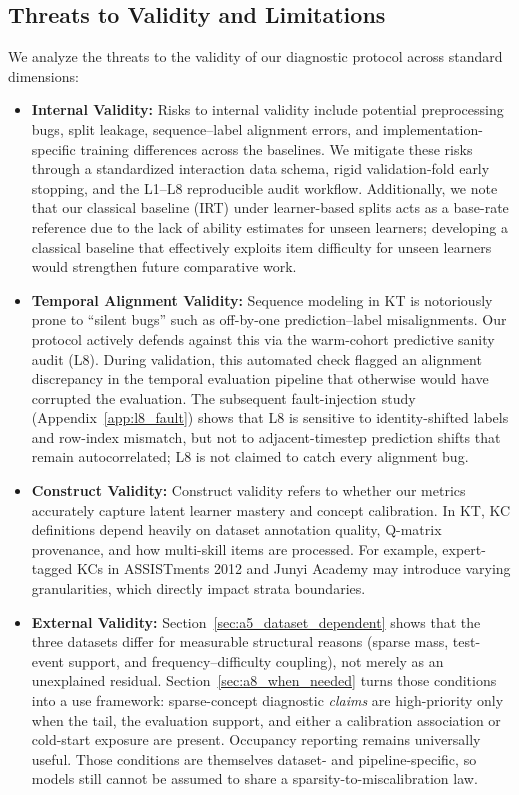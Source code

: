 \subsection{Threats to Validity and Limitations}
\label{sec:threats}
We analyze the threats to the validity of our diagnostic protocol across standard dimensions:
\begin{itemize}
    \item \textbf{Internal Validity:} Risks to internal validity include potential preprocessing bugs, split leakage, sequence--label alignment errors, and implementation-specific training differences across the baselines. We mitigate these risks through a standardized interaction data schema, rigid validation-fold early stopping, and the L1--L8 reproducible audit workflow. Additionally, we note that our classical baseline (IRT) under learner-based splits acts as a base-rate reference due to the lack of ability estimates for unseen learners; developing a classical baseline that effectively exploits item difficulty for unseen learners would strengthen future comparative work.
    \item \textbf{Temporal Alignment Validity:} Sequence modeling in KT is notoriously prone to ``silent bugs'' such as off-by-one prediction--label misalignments. Our protocol actively defends against this via the warm-cohort predictive sanity audit (L8). During validation, this automated check flagged an alignment discrepancy in the temporal evaluation pipeline that otherwise would have corrupted the evaluation. The subsequent fault-injection study (Appendix~\ref{app:l8_fault}) shows that L8 is sensitive to identity-shifted labels and row-index mismatch, but not to adjacent-timestep prediction shifts that remain autocorrelated; L8 is not claimed to catch every alignment bug.
    \item \textbf{Construct Validity:} Construct validity refers to whether our metrics accurately capture latent learner mastery and concept calibration. In KT, KC definitions depend heavily on dataset annotation quality, Q-matrix provenance, and how multi-skill items are processed. For example, expert-tagged KCs in ASSISTments 2012 and Junyi Academy may introduce varying granularities, which directly impact strata boundaries.
    \item \textbf{External Validity:} Section~\ref{sec:a5_dataset_dependent} shows that the three datasets differ for measurable structural reasons (sparse mass, test-event support, and frequency--difficulty coupling), not merely as an unexplained residual. Section~\ref{sec:a8_when_needed} turns those conditions into a use framework: sparse-concept diagnostic \emph{claims} are high-priority only when the tail, the evaluation support, and either a calibration association or cold-start exposure are present. Occupancy reporting remains universally useful. Those conditions are themselves dataset- and pipeline-specific, so models still cannot be assumed to share a sparsity-to-miscalibration law.

\end{itemize}
